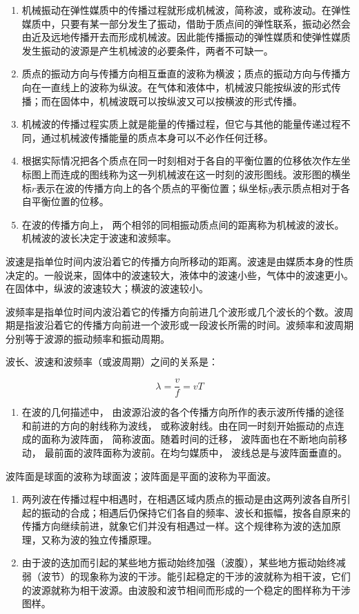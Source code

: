 \begin{enumerate}
\def\labelenumi{\arabic{enumi}.}
\item
  机械振动在弹性媒质中的传播过程就形成机械波，简称波，或称波动。在弹性媒质中，只要有某一部分发生了振动，借助于质点间的弹性联系，振动必然会由近及远地传播开去而形成机械波。因此能传播振动的弹性媒质和使弹性媒质发生振动的波源是产生机械波的必要条件，两者不可缺一。
\item
  质点的振动方向与传播方向相互垂直的波称为横波；质点的振动方向与传播方向在一直线上的波称为纵波。在气体和液体中，机械波只能按纵波的形式传播；而在固体中，机械波既可以按纵波又可以按横波的形式传播。
\item
  机械波的传播过程实质上就是能量的传播过程，但它与其他的能量传递过程不同，通过机械波传播能量的质点本身可以不必作任何迁移。
\item
  根据实际情况把各个质点在同一时刻相对于各自的平衡位置的位移依次作左坐标图上而连成的图线称为这一列机械波在这一时刻的波形图线。波形图的横坐标\(r\)表示在波的传播方向上的各个质点的平衡位置；纵坐标\(y\)表示质点相对于各自平衡位置的位移。
\item
  在波的传播方向上， 两个相邻的同相振动质点间的距离称为机械波的波长。
  机械波的波长决定于波速和波频率。
\end{enumerate}

波速是指单位时间内波沿着它的传播方向所移动的距离。波速是由媒质本身的性质决定的。一般说来，固体中的波速较大，液体中的波速小些，气体中的波速更小。在固体中，纵波的波速较大；横波的波速较小。

波频率是指单位时间内波沿着它的传播方向前进几个波形或几个波长的个数。波周期是指波沿着它的传播方向前进一个波形或一段波长所需的时间。波频率和波周期分别等于波源的振动频率和振动周期。

波长、波速和波频率（或波周期）之间的关系是：

\[
\lambda = \frac {v}{f} = v T
\]

\begin{enumerate}
\def\labelenumi{\arabic{enumi}.}
\setcounter{enumi}{5}
\tightlist
\item
  在波的几何描述中，
  由波源沿波的各个传播方向所作的表示波所传播的途径和前进的方向的射线称为波线，
  或称波射线。由在同一时刻开始振动的点连成的面称为波阵面，
  简称波面。随着时间的迁移， 波阵面也在不断地向前移动，
  最前面的波阵面称为波前。在均匀媒质中， 波线总是与波阵面垂直的。
\end{enumerate}

波阵面是球面的波称为球面波；波阵面是平面的波称为平面波。

\begin{enumerate}
\def\labelenumi{\arabic{enumi}.}
\setcounter{enumi}{6}
\item
  两列波在传播过程中相遇时，在相遇区域内质点的振动是由这两列波各自所引起的振动的合成；相遇后仍保持它们各自的频率、波长和振幅，按各自原来的传播方向继续前进，就象它们并没有相遇过一样。这个规律称为波的迭加原理，又称为波的独立传播原理。
\item
  由于波的迭加而引起的某些地方振动始终加强（波腹），某些地方振动始终减弱（波节）的现象称为波的干涉。能引起稳定的干涉的波就称为相干波，它们的波源就称为相干波源。由波股和波节相间而形成的一个稳定的图样称为干涉图样。
\end{enumerate}

